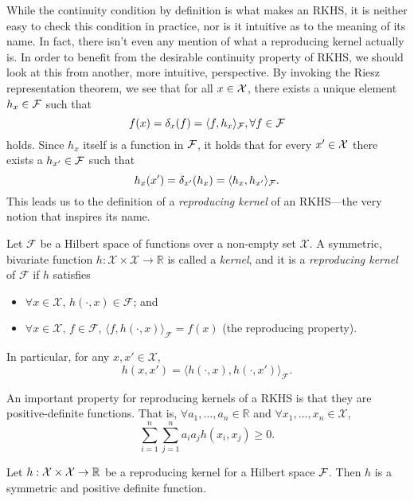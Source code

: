 While the continuity condition by definition is what makes an RKHS, it is neither easy to check this condition in practice, nor is it intuitive as to the meaning of its name.
In fact, there isn't even any mention of what a reproducing kernel actually is.
In order to benefit from the desirable continuity property of RKHS, we should look at this from another, more intuitive, perspective. 
By invoking the Riesz representation theorem, we see that for all $x\in{\mathcal X}$, there exists a unique element $h_x\in{\mathcal F}$ such that
\[
  f(x) = \delta_x(f) = \langle f,h_x\rangle_{\mathcal F}, \forall f \in {\mathcal F}
\]
holds. 
Since $h_x$ itself is a function in ${\mathcal F}$, it holds that for every $x' \in {\mathcal X}$ there exists a $h_{x'}\in{\mathcal F}$ such that
\[
  h_{x}(x') = \delta_{x'}(h_{x}) = \langle h_x,h_{x'}\rangle_{\mathcal F}.
\]
This leads us to the definition of a \emph{reproducing kernel} of an RKHS---the very notion that inspires its name.

\begin{definition}\label{def:repkern}
  Let $\mathcal F$ be a Hilbert space of functions over a non-empty set $\mathcal X$. 
  A symmetric, bivariate function $h:\mathcal X\times\mathcal X\rightarrow\mathbb R$ is called a \emph{kernel}, and it is a \emph{reproducing kernel} of $\mathcal F$ if $h$ satisfies
  \begin{itemize}
    \item $\forall x \in \mathcal X,\, h(\cdot, x) \in \mathcal F$; and
    \item $\forall x \in \mathcal X, \, f \in \mathcal F, \, \langle f, h(\cdot, x) \rangle_{\mathcal F} = f(x)$ (the reproducing property).
  \end{itemize}
  In particular, for any $x, x' \in \mathcal X$,
  \[
  	h(x,x') = \langle h(\cdot, x), h(\cdot, x') \rangle_{\mathcal F}.
  \]
\end{definition}

An important property for reproducing kernels of a RKHS is that they are positive-definite functions.
That is, $\forall a_1, \dots, a_n \in \mathbb R$ and $\forall x_1, \dots, x_n \in \mathcal X$,
\[
  \sum_{i=1}^n\sum_{j=1}^n a_i a_j h(x_i, x_j) \geq 0.
\]

\begin{claim}\label{thm:posdef}
  Let $h:{\mathcal X}\times{\mathcal X}\to\mathbb{R}$ be a reproducing kernel for a Hilbert space ${\mathcal F}$.
  Then $h$ is a symmetric and positive definite function.
\end{claim}

